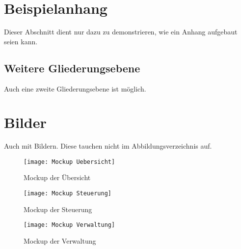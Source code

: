 \section{Beispielanhang}\label{Beispielanhang}
Dieser Abschnitt dient nur dazu zu demonstrieren, wie ein Anhang aufgebaut seien kann.
\subsection{Weitere Gliederungsebene}
Auch eine zweite Gliederungsebene ist möglich.
\section{Bilder}
Auch mit Bildern.
Diese tauchen nicht im Abbildungsverzeichnis auf.
\begin{figure}[H]
    \centering
    \caption[]{Mockup der Übersicht}\label{fig:MockupOverview}
    \texttt{[image: Mockup Uebersicht]}
\end{figure}

\begin{figure}[H]
    \centering
    \caption[]{Mockup der Steuerung}\label{fig:MockupControls}
    \texttt{[image: Mockup Steuerung]}
\end{figure}

\begin{figure}[H]
    \centering
    \caption[]{Mockup der Verwaltung}\label{fig:MockupAdministration}
    \texttt{[image: Mockup Verwaltung]}
\end{figure}